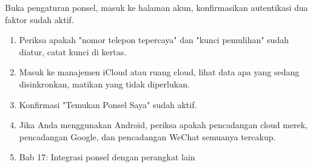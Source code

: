 \begin{tcbpractice}{Buka pengaturan ponsel, masuk ke halaman akun, konfirmasikan autentikasi dua faktor sudah aktif.}
\begin{enumerate}
  \item Periksa apakah "nomor telepon tepercaya" dan "kunci pemulihan" sudah diatur, catat kunci di kertas.
  \item Masuk ke manajemen iCloud atau ruang cloud, lihat data apa yang sedang disinkronkan, matikan yang tidak diperlukan.
  \item Konfirmasi "Temukan Ponsel Saya" sudah aktif.
  \item Jika Anda menggunakan Android, periksa apakah pencadangan cloud merek, pencadangan Google, dan pencadangan WeChat semuanya tercakup.
  \item Bab 17: Integrasi ponsel dengan perangkat lain
\end{enumerate}

\end{tcbpractice}
